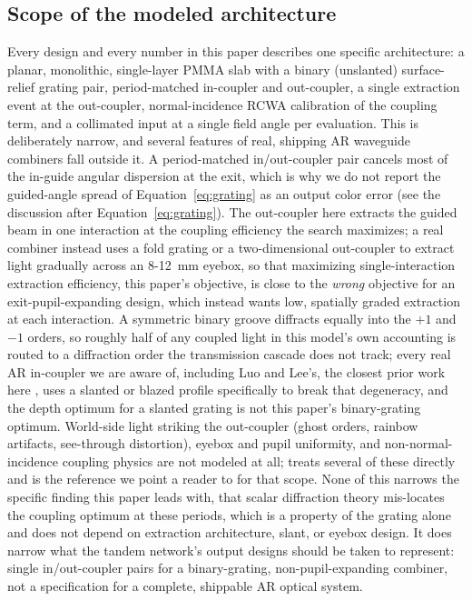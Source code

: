 \documentclass[10pt,twocolumn]{article}
\begin{document}
\subsection{Scope of the modeled architecture}
Every design and every number in this paper describes one specific
architecture: a planar, monolithic, single-layer PMMA slab with a binary
(unslanted) surface-relief grating pair, period-matched in-coupler and
out-coupler, a single extraction event at the out-coupler, normal-incidence
RCWA calibration of the coupling term, and a collimated input at a single
field angle per evaluation. This is deliberately narrow, and several
features of real, shipping AR waveguide combiners fall outside it. A
period-matched in/out-coupler pair cancels most of the in-guide angular
dispersion at the exit, which is why we do not report the guided-angle
spread of Equation~\eqref{eq:grating} as an output color error (see the
discussion after Equation~\eqref{eq:grating}). The out-coupler here extracts
the guided beam in one interaction at the coupling efficiency the search
maximizes; a real combiner instead uses a fold grating or a two-dimensional
out-coupler to extract light gradually across an 8-12~mm eyebox, so that
maximizing single-interaction extraction efficiency, this paper's objective,
is close to the \emph{wrong} objective for an exit-pupil-expanding design,
which instead wants low, spatially graded extraction at each interaction.
A symmetric binary groove diffracts equally into the $+1$ and $-1$ orders,
so roughly half of any coupled light in this model's own accounting is
routed to a diffraction order the transmission cascade does not track;
every real AR in-coupler we are aware of, including Luo and Lee's, the
closest prior work here \cite{luo2024}, uses a slanted or blazed profile
specifically to break that degeneracy, and the depth optimum for a slanted
grating is not this paper's binary-grating optimum. World-side light
striking the out-coupler (ghost orders, rainbow artifacts, see-through
distortion), eyebox and pupil uniformity, and non-normal-incidence coupling
physics are not modeled at all; \cite{lee2025nanophotonics} treats several
of these directly and is the reference we point a reader to for that scope.
None of this narrows the specific finding this paper leads with, that
scalar diffraction theory mis-locates the coupling optimum at these
periods, which is a property of the grating alone and does not depend on
extraction architecture, slant, or eyebox design. It does narrow what the
tandem network's output designs should be taken to represent: single
in/out-coupler pairs for a binary-grating, non-pupil-expanding combiner,
not a specification for a complete, shippable AR optical system.
\end{document}
